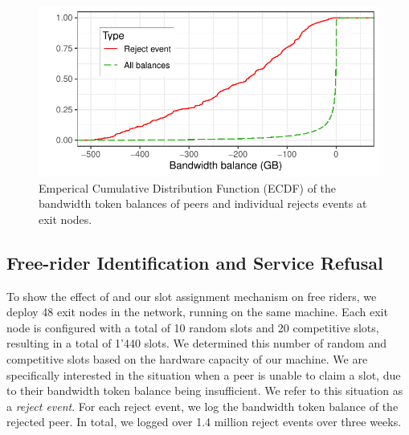 \begin{figure}[t]
	\centering
	\includegraphics[width=.8\linewidth]{trustchain/assets/exit_node_rejects}
	\caption{Emperical Cumulative Distribution Function (ECDF) of the bandwidth token balances of peers and individual rejects events at exit nodes.}
	\label{fig:exit_node_rejects}
\end{figure}

\subsection{Free-rider Identification and Service Refusal}
To show the effect of \ModelName{} and our slot assignment mechanism on free riders, we deploy 48 exit nodes in the \Tribler{} network, running on the same machine.
Each exit node is configured with a total of 10 random slots and 20 competitive slots, resulting in a total of 1'440 slots.
We determined this number of random and competitive slots based on the hardware capacity of our machine.
We are specifically interested in the situation when a peer is unable to claim a slot, due to their bandwidth token balance being insufficient.
We refer to this situation as a \emph{reject event}.
For each reject event, we log the bandwidth token balance of the rejected peer.
In total, we logged over 1.4 million reject events over three weeks.

